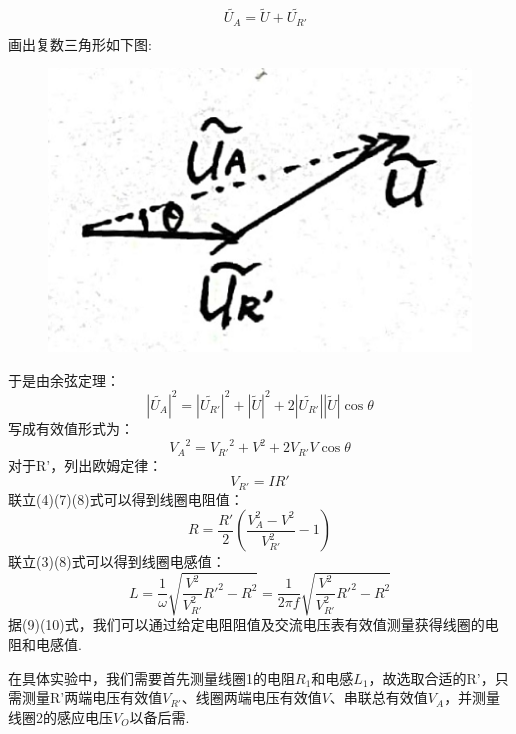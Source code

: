 \documentclass[UTF8]{ctexart}
\begin{document}
\vspace{-2em}
\begin{equation} 
    \begin{aligned}
        &\tilde{U_A}=\tilde{U}+\tilde{U_{R'}}\\
    \end{aligned}
\end{equation}
画出复数三角形如下图:
\begin{figure}[H]\begin{center}
    \includegraphics*[scale = 0.4]{4.png}
\end{center}\end{figure}
\vspace{-2em}
于是由余弦定理：
\begin{equation}
    |\tilde{U_A}|^2=|\tilde{U_{R'}}|^2+|\tilde{U}|^2+2|\tilde{U_{R'}}||\tilde{U}|\cos\theta
\end{equation}
写成有效值形式为：
\begin{equation}
    {V_A}^2={V_{R'}}^2+{V}^2+2V_{R'}{V}\cos\theta
\end{equation}
对于R'，列出欧姆定律：
\begin{equation}
    V_{R'}=IR'
\end{equation}
联立(4)(7)(8)式可以得到线圈电阻值：
\begin{equation}
    R=\frac{R'}{2}(\frac{V_A^2-V^2}{V_{R'}^2}-1)
\end{equation}
联立(3)(8)式可以得到线圈电感值：
\begin{equation}
    L=\frac{1}{\omega}\sqrt{\frac{V^2}{V_{R'}^2}R'^2-R^2}
    =\frac{1}{2\pi f}\sqrt{\frac{V^2}{V_{R'}^2}R'^2-R^2}
\end{equation}
据(9)(10)式，我们可以通过给定电阻阻值及交流电压表有效值测量获得线圈的电阻和电感值.\par
在具体实验中，我们需要首先测量线圈1的电阻$R_1$和电感$L_1$，故选取合适的R'，只需测量R'两端电压有效值$V_{R'}$、线圈两端电压有效值$V$、串联总有效值$V_A$，并测量线圈2的感应电压$V_O$以备后需. \par
\end{document}
